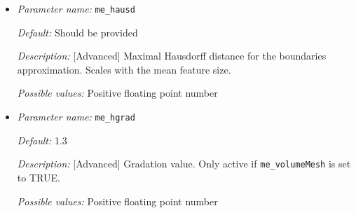 \begin{itemize}
	{\it Possible values:} Non-negative floating point number
	
	\item {\it Parameter name:} {\tt me\_hausd}
	\label{parameters:me_hausd}
	
	
	{\it Default:} Should be provided
	
	{\it Description:} [Advanced] Maximal Hausdorff distance for the boundaries approximation. Scales with the mean feature size.
	
	{\it Possible values:} Positive floating point number
	
	\item {\it Parameter name:} {\tt me\_hgrad}
	\label{parameters:me_hgrad}
	
	
	{\it Default:} 1.3
	
	{\it Description:} [Advanced] Gradation value. Only active if {\tt  me\_volumeMesh} is set to TRUE.
	
	{\it Possible values:} Positive floating point number
	
\end{itemize}
